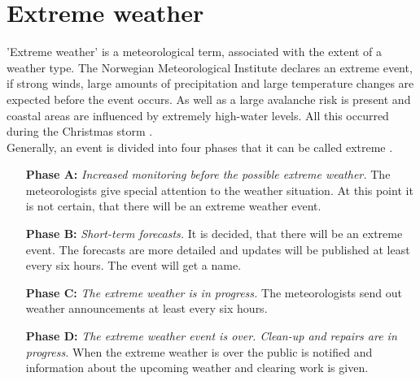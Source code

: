 \section{Extreme weather}
'Extreme weather' is a meteorological term, associated with the extent of a weather type. The Norwegian Meteorological Institute declares an extreme event, if strong winds, large amounts of precipitation and large temperature changes are expected before the event occurs. As well as a large avalanche risk is present and coastal areas are influenced by extremely high-water levels. All this occurred during the Christmas storm \citep{olsen_ekstremvaerrapport._2017}.
\\
Generally, an event is divided into four phases that it can be called extreme \citep{pedersen_hva_2013}. 
\begin{itemize}
	\setlength\itemsep{-.85em}
	\item[\textbf{Phase A:}] \textit{Increased monitoring before the possible extreme weather.} The meteorologists give special attention to the weather situation. At this point it is not certain, that there will be an extreme weather event.
	\item[\textbf{Phase B:}] \textit{Short-term forecasts.} It is decided, that there will be an extreme event. The forecasts are more detailed and updates will be published at least every six hours. The event will get a name.
	\item[\textbf{Phase C:}] \textit{The extreme weather is in progress.} The meteorologists send out weather announcements at least every six hours.
	\item[\textbf{Phase D:}] \textit{The extreme weather event is over. Clean-up and repairs are in progress.} When the extreme weather is over the public is notified and information about the upcoming weather and clearing work is given.
\end{itemize}

